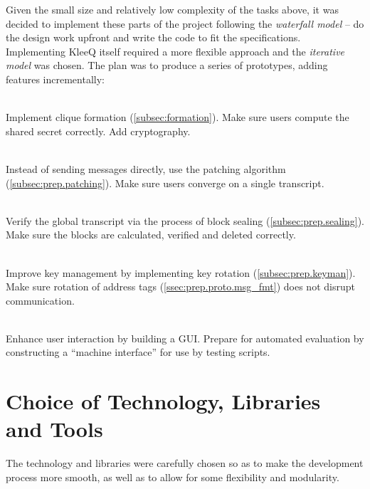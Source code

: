 \documentclass[a4paper, 12pt]{report}
\begin{document}
Given the small size and relatively low complexity of the tasks above, it was decided to implement these parts of the project following the \emph{waterfall model} -- do the design work upfront and write the code to fit the specifications. \\

Implementing KleeQ itself required a more flexible approach and the \emph{iterative model} was chosen. The plan was to produce a series of prototypes, adding features incrementally:
\begin{description}[labelindent=0.5cm, leftmargin=1.3cm, rightmargin=0.5cm]
    \item[Prototype 1: Clique Formation]\hfill \\
        Implement clique formation (\cref{subsec:formation}). Make sure users compute the shared secret correctly. Add cryptography.
    \item[Prototype 2: Patching]\hfill \\
        Instead of sending messages directly, use the patching algorithm (\cref{subsec:prep.patching}). Make sure users converge on a single transcript.
    \item[Prototype 3: Sealing]\hfill \\
        Verify the global transcript via the process of block sealing (\cref{subsec:prep.sealing}). Make sure the blocks are calculated, verified and deleted correctly.
    \item[Prototype 4: Key Management]\hfill \\
        Improve key management by implementing key rotation (\cref{subsec:prep.keyman}). Make sure rotation of address tags (\cref{ssec:prep.proto.msg_fmt}) does not disrupt communication.
    \item[Prototype 5: Interface] \hfill \\
        Enhance user interaction by building a GUI. Prepare for automated evaluation by constructing a ``machine interface'' for use by testing scripts. 
\end{description}

\section{Choice of Technology, Libraries and Tools}
The technology and libraries were carefully chosen so as to make the development process more smooth, as well as to allow for some flexibility and modularity.
\end{document}
